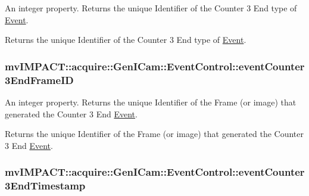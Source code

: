 An integer property. Returns the unique Identifier of the Counter 3 End type of \hyperlink{classmv_i_m_p_a_c_t_1_1acquire_1_1_event}{Event}. 

Returns the unique Identifier of the Counter 3 End type of \hyperlink{classmv_i_m_p_a_c_t_1_1acquire_1_1_event}{Event}. \hypertarget{classmv_i_m_p_a_c_t_1_1acquire_1_1_gen_i_cam_1_1_event_control_a9ecc85227bdbe020c65ba21a96aee337}{
\subsubsection[{event\+Counter3\+End\+Frame\+I\+D}]{ mv\+I\+M\+P\+A\+C\+T\+::acquire\+::\+Gen\+I\+Cam\+::\+Event\+Control\+::event\+Counter3\+End\+Frame\+I\+D}}\label{classmv_i_m_p_a_c_t_1_1acquire_1_1_gen_i_cam_1_1_event_control_a9ecc85227bdbe020c65ba21a96aee337}


An integer property. Returns the unique Identifier of the Frame (or image) that generated the Counter 3 End \hyperlink{classmv_i_m_p_a_c_t_1_1acquire_1_1_event}{Event}. 

Returns the unique Identifier of the Frame (or image) that generated the Counter 3 End \hyperlink{classmv_i_m_p_a_c_t_1_1acquire_1_1_event}{Event}. \hypertarget{classmv_i_m_p_a_c_t_1_1acquire_1_1_gen_i_cam_1_1_event_control_a1d62595185ff404bac88cc8902a8fb80}{
\subsubsection[{event\+Counter3\+End\+Timestamp}]{ mv\+I\+M\+P\+A\+C\+T\+::acquire\+::\+Gen\+I\+Cam\+::\+Event\+Control\+::event\+Counter3\+End\+Timestamp}}\label{classmv_i_m_p_a_c_t_1_1acquire_1_1_gen_i_cam_1_1_event_control_a1d62595185ff404bac88cc8902a8fb80}



